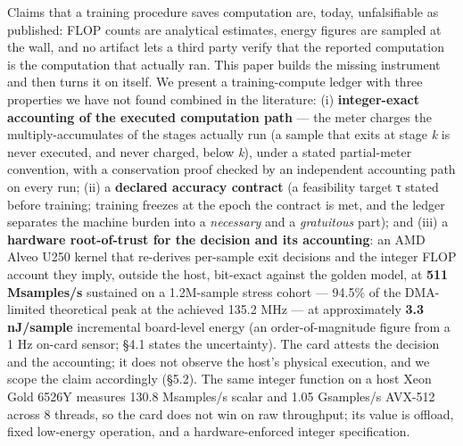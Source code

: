 \documentclass[
]{article}
\begin{document}
Claims that a training procedure saves computation are, today,
unfalsifiable as published: FLOP counts are analytical estimates, energy
figures are sampled at the wall, and no artifact lets a third party
verify that the reported computation is the computation that actually
ran. This paper builds the missing instrument and then turns it on
itself. We present a training-compute ledger with three properties we
have not found combined in the literature: (i) \textbf{integer-exact
accounting of the executed computation path} --- the meter charges the
multiply-accumulates of the stages actually run (a sample that exits at
stage \emph{k} is never executed, and never charged, below \emph{k}),
under a stated partial-meter convention, with a conservation proof
checked by an independent accounting path on every run; (ii) a
\textbf{declared accuracy contract} (a feasibility target τ stated
before training; training freezes at the epoch the contract is met, and
the ledger separates the machine burden into a \emph{necessary} and a
\emph{gratuitous} part); and (iii) a \textbf{hardware root-of-trust for
the decision and its accounting}: an AMD Alveo U250 kernel that
re-derives per-sample exit decisions and the integer FLOP account they
imply, outside the host, bit-exact against the golden model, at
\textbf{511 Msamples/s} sustained on a 1.2M-sample stress cohort ---
94.5\% of the DMA-limited theoretical peak at the achieved 135.2 MHz ---
at approximately \textbf{3.3 nJ/sample} incremental board-level energy
(an order-of-magnitude figure from a 1 Hz on-card sensor; §4.1 states
the uncertainty). The card attests the decision and the accounting; it
does not observe the host's physical execution, and we scope the claim
accordingly (§5.2). The same integer function on a host Xeon Gold 6526Y
measures 130.8 Msamples/s scalar and 1.05 Gsamples/s AVX-512 across 8
threads, so the card does not win on raw throughput; its value is
offload, fixed low-energy operation, and a hardware-enforced integer
specification.
\end{document}
